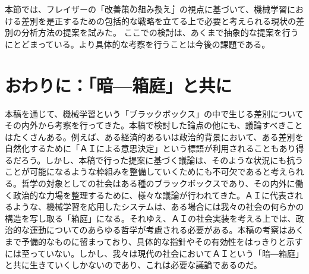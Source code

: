 \documentclass[b5j,twoside,twocolumn]{utarticle}
\begin{document}
本節では、フレイザーの「\.改\.善\.策\.の\.組\.み\.換\.え」の視点に基づいて、機械学習における差別を是正するための包括的な戦略を立てる上で必要と考えられる現状の差別の分析方法の提案を試みた。
ここでの検討は、あくまで抽象的な提案を行うにとどまっている。より具体的な考察を行うことは今後の課題である。











\section{\tbaselineshift=3.0pt おわりに：「暗---箱庭」と共に}
本稿を通じて、機械学習という「ブラックボックス」の中で生じる差別についてその内外から考察を行ってきた。本稿で検討した論点の他にも、議論すべきことはたくさんある。例えば、ある経済的あるいは政治的背景において、ある差別を自然化するために「ＡＩによる意思決定」という標語が利用されることもあり得るだろう。しかし、本稿で行った提案に基づく議論は、そのような状況にも抗うことが可能になるような枠組みを整備していくためにも不可欠であると考えられる。哲学の対象としての社会はある種のブラックボックスであり、その内外に働く政治的な力場を整理するために、様々な議論が行われてきた。ＡＩに代表されるような、機械学習を応用したシステムは、ある場合には我々の社会の何らかの構造を写し取る「箱庭」になる。それゆえ、ＡＩの社会実装を考える上では、政治的な運動についてのあらゆる哲学が考慮される必要がある。本稿の考察はあくまで予備的なものに留まっており、具体的な指針やその有効性をはっきりと示すには至っていない。しかし、我々は現代の社会においてＡＩという「暗―箱庭」と共に生きていくしかないのであり、これは必要な議論であるのだ。
\end{document}
